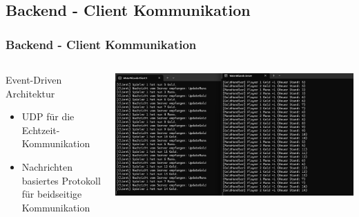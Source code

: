 \documentclass{beamer}
\begin{document}
\subsection{Backend - Client Kommunikation}
\begin{frame}
\frametitle{Backend - Client Kommunikation}
\begin{columns}
  \begin{column}{0.45\textwidth}
    Event-Driven Architektur
    \begin{itemize}
      \item UDP für die Echtzeit-Kommunikation
      \item Nachrichten basiertes Protokoll für beidseitige Kommunikation
    \end{itemize}
  \end{column}
  \begin{column}{0.55\textwidth}
    \includegraphics[width=\textwidth]{Server-Client-Logs.png}
  \end{column}
\end{columns}
\end{frame}
\end{document}
